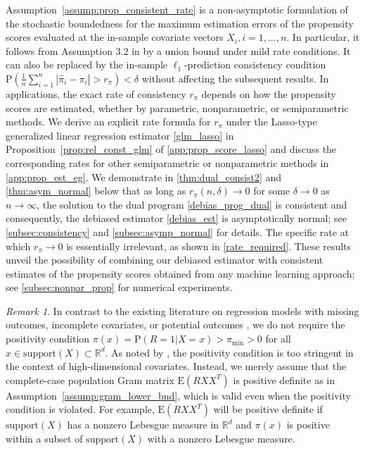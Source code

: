 \documentclass[ejsv2,noshowframe]{imsart}
\theoremstyle{plain}
\theoremstyle{definition}
\theoremstyle{remark}
\newtheorem{remark}{Remark}
\renewcommand{\hat}{\widehat}
\begin{document}
Assumption~\ref{assump:prop_consistent_rate} is a non-asymptotic formulation of the stochastic boundedness for the maximum estimation errors of the propensity scores evaluated at the in-sample covariate vectors $X_i,i=1,...,n$. In particular, it follows from Assumption 3.2 in \cite{chakrabortty2019high} by a union bound under mild rate conditions. It can also be replaced by the in-sample $\ell_1$-prediction consistency condition $\mathrm{P}\left(\frac{1}{n}\sum_{i=1}^n \left|\hat{\pi}_i - \pi_i\right| > r_{\pi}\right) < \delta$ without affecting the subsequent results. In applications, the exact rate of consistency $r_{\pi}$ depends on how the propensity scores are estimated, whether by parametric, nonparametric, or semiparametric methods. We derive an explicit rate formula for $r_{\pi}$ under the Lasso-type generalized linear regression estimator \eqref{glm_lasso} in Proposition~\ref{prop:rel_const_glm} of \autoref{app:prop_score_lasso} and discuss the corresponding rates for other semiparametric or nonparametric methods in \autoref{app:prop_est_eg}. 
We demonstrate in \autoref{thm:dual_consist2} and \autoref{thm:asym_normal} below that as long as $r_{\pi}(n,\delta)\to 0$ for some $\delta \to 0$ as $n\to \infty$, the solution to the dual program \eqref{debias_prog_dual} is consistent and consequently, the debiased estimator \eqref{debias_est} is asymptotically normal; see \autoref{subsec:consistency} and \autoref{subsec:asymp_normal} for details. The specific rate at which $r_{\pi} \to 0$ is essentially irrelevant, as shown in \eqref{rate_required}. These results unveil the possibility of combining our debiased estimator with consistent estimates of the propensity scores obtained from any machine learning approach; see \autoref{subsec:nonpar_prop} for numerical experiments.


\begin{remark}
	In contrast to the existing literature on regression models with missing outcomes, incomplete covariates, or potential outcomes \citep{rosenbaum1983central,robins1994estimation,chakrabortty2019high}, we do not require the positivity condition $\pi(x)=\mathrm{P}(R=1|X=x) > \pi_{\min} > 0$ for all $x\in \mathrm{support}(X) \subset \mathbb{R}^d$. As noted by \cite{d2021overlap}, the positivity condition is too stringent in the context of high-dimensional covariates. Instead, we merely assume that the complete-case population Gram matrix $\mathrm{E}\left(RXX^T\right)$ is positive definite as in Assumption~\ref{assump:gram_lower_bnd}, which is valid even when the positivity condition is violated. For example, $\mathrm{E}\left(RXX^T\right)$ will be positive definite if $\mathrm{support}(X)$ has a nonzero Lebesgue measure in $\mathbb{R}^d$ and $\pi(x)$ is positive within a subset of $\mathrm{support}(X)$ with a nonzero Lebesgue measure.
\end{remark}
\end{document}
